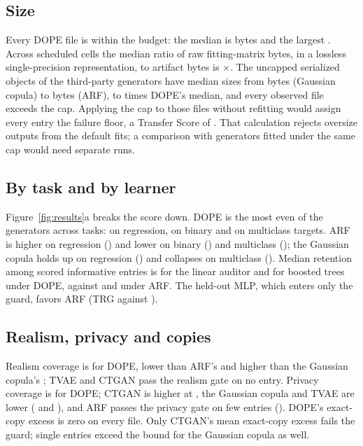 \documentclass[10pt,letterpaper,twocolumn]{article}
\newcommand{\x}{\ensuremath{\times}}
\begin{document}
\subsection{Size}
Every DOPE file is within the budget: the median is  bytes and the largest . Across scheduled cells the median ratio of raw fitting-matrix bytes, in a lossless single-precision representation, to artifact bytes is \x{}. The uncapped serialized objects of the third-party generators have median sizes from  bytes (Gaussian copula) to  bytes (ARF),  to  times DOPE's median, and every observed file exceeds the cap. Applying the cap to those files without refitting would assign every entry the failure floor, a Transfer Score of . That calculation rejects oversize outputs from the default fits; a comparison with generators fitted under the same cap would need separate runs.

\subsection{By task and by learner}
Figure~\ref{fig:results}a breaks the score down. DOPE is the most even of the generators across tasks:  on regression,  on binary and  on multiclass targets. ARF is higher on regression () and lower on binary () and multiclass (); the Gaussian copula holds up on regression () and collapses on multiclass (). Median retention among scored informative entries is  for the linear auditor and  for boosted trees under DOPE, against  and  under ARF. The held-out MLP, which enters only the guard, favors ARF (TRG  against ).

\subsection{Realism, privacy and copies}
Realism coverage is  for DOPE, lower than ARF's  and higher than the Gaussian copula's ; TVAE and CTGAN pass the realism gate on no entry. Privacy coverage is  for DOPE; CTGAN is higher at , the Gaussian copula and TVAE are lower ( and ), and ARF passes the privacy gate on few entries (). DOPE's exact-copy excess is zero on every file. Only CTGAN's mean exact-copy excess fails the guard; single entries exceed the bound for the Gaussian copula as well.
\end{document}
